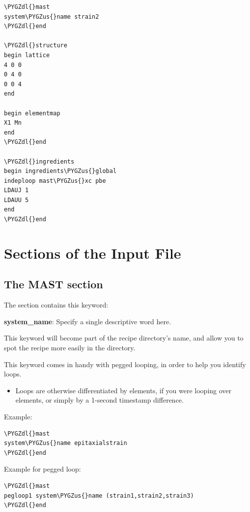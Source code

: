 \documentclass[letterpaper,10pt,english]{sphinxmanual}
\def\PYGZus{\char`\_}
\def\PYGZdl{\char`\$}
\begin{document}
\begin{Verbatim}[commandchars=\\\{\}]
\PYGZdl{}mast
system\PYGZus{}name strain2
\PYGZdl{}end

\PYGZdl{}structure
begin lattice
4 0 0
0 4 0
0 0 4
end

begin elementmap
X1 Mn
end
\PYGZdl{}end

\PYGZdl{}ingredients
begin ingredients\PYGZus{}global
indeploop mast\PYGZus{}xc pbe
LDAUJ 1
LDAUU 5
end
\PYGZdl{}end
\end{Verbatim}


\chapter{Sections of the Input File}
\label{3_1_inputsections:sections-of-the-input-file}\label{3_1_inputsections::doc}

\section{The MAST section}
\label{3_1_0_mast::doc}\label{3_1_0_mast:the-mast-section}
The  section contains this keyword:

\textbf{system\_name}: Specify a single descriptive word here.

This keyword will become part of the recipe directory's name, and allow you to spot the recipe more easily in the  directory.

This keyword comes in handy with pegged looping, in order to help you identify loops.
\begin{itemize}
\item {} 
Loops are otherwise differentiated by elements, if you were looping over elements, or simply by a 1-second timestamp difference.

\end{itemize}

Example:

\begin{Verbatim}[commandchars=\\\{\}]
\PYGZdl{}mast
system\PYGZus{}name epitaxialstrain
\PYGZdl{}end
\end{Verbatim}

Example for pegged loop:

\begin{Verbatim}[commandchars=\\\{\}]
\PYGZdl{}mast
pegloop1 system\PYGZus{}name (strain1,strain2,strain3)
\PYGZdl{}end
\end{Verbatim}
\end{document}
